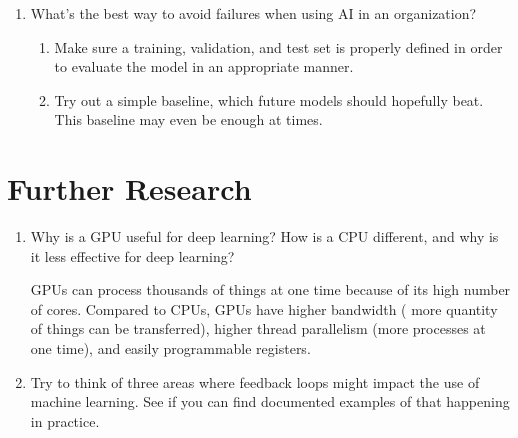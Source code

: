 \documentclass[12pt,a4paper]{article}
\begin{document}
\begin{enumerate}
\item What's the best way to avoid failures when using AI in an organization? \\

\begin{enumerate}
\item Make sure a training, validation, and test set is properly defined in order to evaluate the model in an appropriate manner. \\
\item Try out a simple baseline, which future models should hopefully beat. This baseline may even be enough at times. \\
\end{enumerate}

\end{enumerate}

\section*{Further Research}

\begin{enumerate}

\item Why is a GPU useful for deep learning? How is a CPU different, and why is it less effective for deep learning? \\

\smallbreak

GPUs can process thousands of things at one time because of its high number of cores. Compared to CPUs, GPUs have higher bandwidth ( more quantity of things can be transferred), higher thread parallelism (more processes at one time), and easily programmable registers.

\bigbreak

\item Try to think of three areas where feedback loops might impact the use of machine learning. See if you can find documented examples of that happening in practice.
\end{enumerate}
\end{document}
